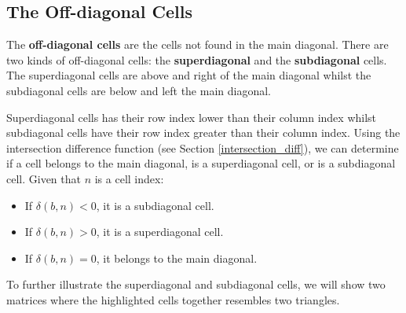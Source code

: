 \documentclass[letterpaper, twoside,12pt]{article}
\begin{document}
    \subsection{The Off-diagonal Cells} \label{offdiagonal_cells}
    The \textbf{off-diagonal cells} are the cells not found in the main diagonal. There are two kinds of off-diagonal cells: the \textbf{superdiagonal} and the \textbf{subdiagonal} cells. The superdiagonal cells are above and right of the main diagonal whilst the subdiagonal cells are below and left the main diagonal.

    Superdiagonal cells has their row index lower than their column index whilst subdiagonal cells have their row index greater than their column index. Using the intersection difference function (see Section \ref{intersection_diff}), we can determine if a cell belongs to the main diagonal, is a superdiagonal cell, or is a subdiagonal cell. Given that $n$ is a cell index:
    \begin{itemize}
        \item If $\delta(b,n) < 0$, it is a subdiagonal cell.
        \item If $\delta(b,n) > 0$, it is a superdiagonal cell.
        \item If $\delta(b,n) = 0$, it belongs to the main diagonal.
    \end{itemize}

    To further illustrate the superdiagonal and subdiagonal cells, we will show two matrices where the highlighted cells together resembles two triangles.
\end{document}
